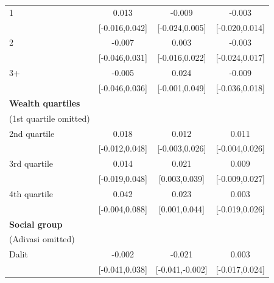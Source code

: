\begin{tabular}{l*{3}{c}}
\addlinespace
\hspace*{1em}1      &                 0.013&                -0.009&                -0.003\\
                    &        [-0.016,0.042]&        [-0.024,0.005]&        [-0.020,0.014]\\
\addlinespace
\hspace*{1em}2      &                -0.007&                 0.003&                -0.003\\
                    &        [-0.046,0.031]&        [-0.016,0.022]&        [-0.024,0.017]\\
\addlinespace
\hspace*{1em}3+     &                -0.005&                 0.024&                -0.009\\
                    &        [-0.046,0.036]&        [-0.001,0.049]&        [-0.036,0.018]\\
\addlinespace
\textbf{Wealth quartiles} \\ (1st quartile omitted)&                      &                      &                      \\
\addlinespace
\hspace*{1em}2nd quartile&                 0.018&                 0.012&                 0.011\\
                    &        [-0.012,0.048]&        [-0.003,0.026]&        [-0.004,0.026]\\
\addlinespace
\hspace*{1em}3rd quartile&                 0.014&                 0.021&                 0.009\\
                    &        [-0.019,0.048]&         [0.003,0.039]&        [-0.009,0.027]\\
\addlinespace
\hspace*{1em}4th quartile&                 0.042&                 0.023&                 0.003\\
                    &        [-0.004,0.088]&         [0.001,0.044]&        [-0.019,0.026]\\
\addlinespace
\textbf{Social group} \\ (Adivasi omitted)&                      &                      &                      \\
\addlinespace
\hspace*{1em}Dalit  &                -0.002&                -0.021&                 0.003\\
                    &        [-0.041,0.038]&       [-0.041,-0.002]&        [-0.017,0.024]\\

\end{tabular}
